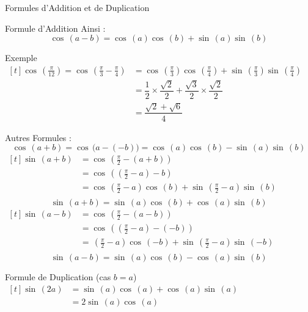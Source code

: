 \documentclass{coursbook}
\begin{document}
\begin{Gpartie}{Formules d'Addition et de Duplication}
\begin{Spartie}{Formule d'Addition}
            Ainsi : \[\cos\,(a-b)=\cos\,(a)\cos\,(b)+\sin\,(a)\sin\,(b)\]
            \begin{SSpartie}{Exemple} 
                $\begin{aligned}[t]
                    \cos\,\left(\frac{\pi}{12}\right)=\cos\,\left(\frac{\pi}{3}-\frac{\pi}{4}\right) &= \cos\,\left(\frac{\pi}{3}\right)\cos\,\left(\frac{\pi}{4}\right)+\sin\,\left(\frac{\pi}{3}\right)\sin\,\left(\frac{\pi}{4}\right) \\
                    &= \dfrac{1}{2}\times\dfrac{\sqrt{2}}{2}+\dfrac{\sqrt{3}}{2}\times\dfrac{\sqrt{2}}{2} \\
                    &= \dfrac{\sqrt{2}+\sqrt{6}}{4}
                \end{aligned}$
            \end{SSpartie}
            Autres Formules :
            \[\cos\,(a+b)=\cos\,\big(a-(-b)\big)=\cos\,(a)\cos\,(b)-\sin\,(a)\sin\,(b)\]
            $\begin{aligned}[t]
                \sin\,(a+b) &= \cos\,\left(\frac{\pi}{2}-(a+b)\right) \\
                &= \cos\,\left(\left(\frac{\pi}{2}-a\right)-b\right) \\
                &= \cos\,\left(\frac{\pi}{2}-a\right)\cos\,(b)+\sin\,\left(\frac{\pi}{2}-a\right)\sin\,(b) \\
            \end{aligned}$
            \[\sin\,(a+b)=\sin\,(a)\cos\,(b)+\cos\,(a)\sin\,(b)\]
            $\begin{aligned}[t]
                \sin\,(a-b) &= \cos\,\left(\frac{\pi}{2}-(a-b)\right) \\
                &= \cos\,\left(\left(\frac{\pi}{2}-a\right)-(-b)\right) \\
                &= \,\left(\frac{\pi}{2}-a\right)\cos\,(-b)+\sin\,\left(\frac{\pi}{2}-a\right)\sin\,(-b) \\
            \end{aligned}$
            \[\sin\,(a-b)=\sin\,(a)\cos\,(b)-\cos\,(a)\sin\,(b)\]
        \end{Spartie}
        \begin{Spartie}{Formule de Duplication (cas $b=a$)} 
            $\begin{aligned}[t]
                \sin\,(2a) &= \sin\,(a)\cos\,(a)+\cos\,(a)\sin\,(a) \\
                &=2\sin\,(a)\cos\,(a)
            \end{aligned}$


\end{Spartie}
\end{Gpartie}
\end{document}
